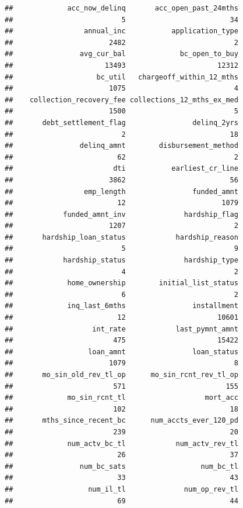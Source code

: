 \documentclass[]{article}
\begin{document}
\begin{verbatim}
##             acc_now_delinq       acc_open_past_24mths 
##                          5                         34 
##                 annual_inc           application_type 
##                       2482                          2 
##                avg_cur_bal             bc_open_to_buy 
##                      13493                      12312 
##                    bc_util   chargeoff_within_12_mths 
##                       1075                          4 
##    collection_recovery_fee collections_12_mths_ex_med 
##                       1500                          5 
##       debt_settlement_flag                delinq_2yrs 
##                          2                         18 
##                delinq_amnt        disbursement_method 
##                         62                          2 
##                        dti           earliest_cr_line 
##                       3862                         56 
##                 emp_length                funded_amnt 
##                         12                       1079 
##            funded_amnt_inv              hardship_flag 
##                       1207                          2 
##       hardship_loan_status            hardship_reason 
##                          5                          9 
##            hardship_status              hardship_type 
##                          4                          2 
##             home_ownership        initial_list_status 
##                          6                          2 
##             inq_last_6mths                installment 
##                         12                      10601 
##                   int_rate            last_pymnt_amnt 
##                        475                      15422 
##                  loan_amnt                loan_status 
##                       1079                          8 
##       mo_sin_old_rev_tl_op      mo_sin_rcnt_rev_tl_op 
##                        571                        155 
##             mo_sin_rcnt_tl                   mort_acc 
##                        102                         18 
##       mths_since_recent_bc      num_accts_ever_120_pd 
##                        239                         20 
##             num_actv_bc_tl            num_actv_rev_tl 
##                         26                         37 
##                num_bc_sats                  num_bc_tl 
##                         33                         43 
##                  num_il_tl              num_op_rev_tl 
##                         69                         44 

\end{verbatim}
\end{document}
